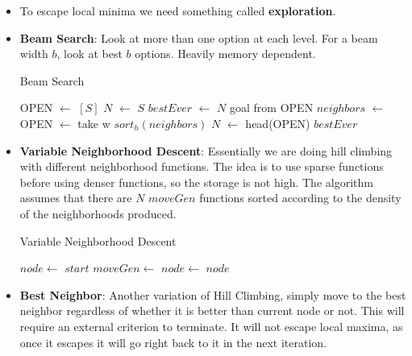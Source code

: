 \documentclass[a4paper]{article}
\begin{document}
\begin{itemize}
    \item To escape local minima we need something called \textbf{exploration}.
    \item \textbf{Beam Search}: Look at more than one option at each level. For a beam width $b$, look at best $b$ options. Heavily memory dependent.
    \begin{algorithm}
        \caption{Beam Search}\label{alg:Beam-Search}
        \begin{algorithmic}
            \Statex {}
            \State OPEN $\gets$ $[S]$
            \State $N$ $\gets$ $S$
            \Do
                \State $bestEver$ $\gets$ $N$
                    \State \Return goal from OPEN
                \EndIf
                \State $neighbors$ $\gets$ 
                \State OPEN $\gets$ take w $sort_h(neighbors)$
                \State $N$ $\gets$ head(OPEN)
            \State \Return $bestEver$
        \end{algorithmic}
    \end{algorithm}
    \item \textbf{Variable Neighborhood Descent}: Essentially we are doing hill climbing with different neighborhood functions. The idea is to use sparse functions before using denser functions, so the storage is not high. The algorithm assumes that there are $N$ $moveGen$ functions sorted according to the density of the neighborhoods produced.
    \begin{algorithm}[H]
        \caption{Variable Neighborhood Descent}\label{alg:Variable-Neighborhood-Descent}
        \begin{algorithmic}[1]
            \Statex {}
            \State $node\gets$ $start$
                \State $moveGen\gets$ 
                \State $node\gets$ 
            \EndFor
            \State \Return $node$
        \end{algorithmic}
    \end{algorithm}
    \item \textbf{Best Neighbor}: Another variation of Hill Climbing, simply move to the best neighbor regardless of whether it is better than current node or not. This will require an external criterion to terminate. It will not escape local maxima, as once it escapes it will go right back to it in the next iteration.

\end{itemize}
\end{document}
